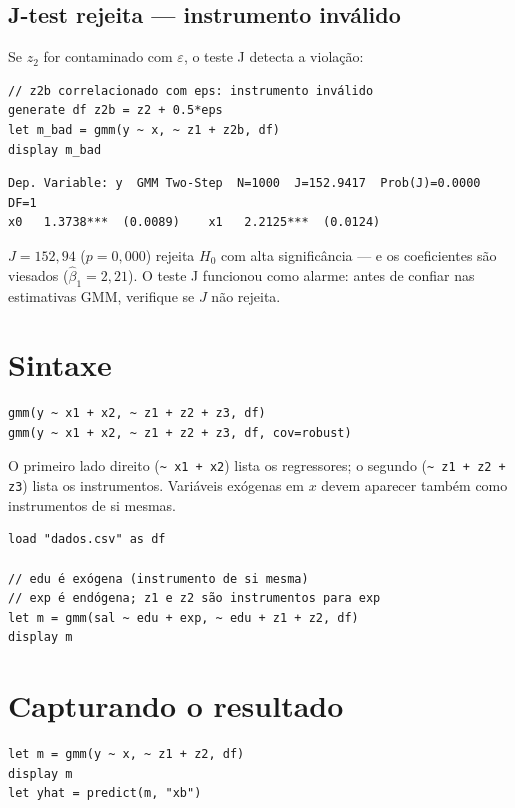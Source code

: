 \subsection*{J-test rejeita — instrumento inválido}

Se $z_2$ for contaminado com $\varepsilon$, o teste J detecta a violação:

\begin{lstlisting}[caption={Instrumento inválido — J-test rejeita}]
// z2b correlacionado com eps: instrumento inválido
generate df z2b = z2 + 0.5*eps
let m_bad = gmm(y ~ x, ~ z1 + z2b, df)
display m_bad
\end{lstlisting}

\begin{lstlisting}[language={}, basicstyle=\ttfamily\scriptsize,
  frame=none, numbers=none, backgroundcolor=\color{codbg},
  xleftmargin=0pt, xrightmargin=0pt, breaklines=false]
Dep. Variable: y  GMM Two-Step  N=1000  J=152.9417  Prob(J)=0.0000  DF=1
x0   1.3738***  (0.0089)    x1   2.2125***  (0.0124)
\end{lstlisting}

$J = 152{,}94$ ($p = 0{,}000$) rejeita $H_0$ com alta significância — e os
coeficientes são viesados ($\hat\beta_1 = 2{,}21$). O teste J funcionou como
alarme: antes de confiar nas estimativas GMM, verifique se $J$ não rejeita.

\section{Sintaxe}

\begin{lstlisting}
gmm(y ~ x1 + x2, ~ z1 + z2 + z3, df)
gmm(y ~ x1 + x2, ~ z1 + z2 + z3, df, cov=robust)
\end{lstlisting}

O primeiro lado direito (\lstinline{~ x1 + x2}) lista os regressores;
o segundo (\lstinline{~ z1 + z2 + z3}) lista os instrumentos. Variáveis
exógenas em $x$ devem aparecer também como instrumentos de si mesmas.

\begin{lstlisting}[caption={Fluxo típico com variável exógena inclusa}]
load "dados.csv" as df

// edu é exógena (instrumento de si mesma)
// exp é endógena; z1 e z2 são instrumentos para exp
let m = gmm(sal ~ edu + exp, ~ edu + z1 + z2, df)
display m
\end{lstlisting}

\section{Capturando o resultado}

\begin{lstlisting}
let m = gmm(y ~ x, ~ z1 + z2, df)
display m
let yhat = predict(m, "xb")
\end{lstlisting}
